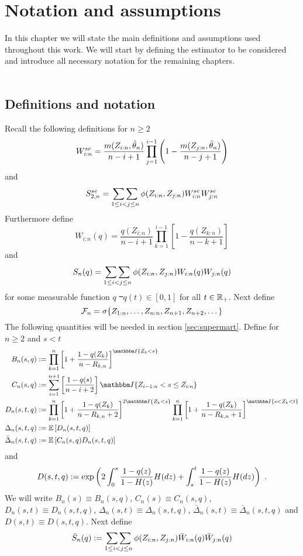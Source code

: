 \chapter{Notation and assumptions} \label{ch:notation}
In this chapter we will state the main definitions and assumptions used throughout this work. We will start by defining the estimator to be considered and introduce all necessary notation for the remaining chapters.\\
\\
\section{Definitions and notation}
Recall the following definitions for $n\geq2$
$$W_{i:n}^{se} = \frac{m(Z_{i:n}, \hat{\theta}_n)}{n-i+1} \prod\limits_{j=1}^{i-1}\left(1-\frac{m(Z_{j:n}, \hat{\theta}_n)}{n-j+1}\right)$$
%
and
$$S_{2,n}^{se} = \mathop{\sum\sum}\limits_{1\leq i<j\leq n}\phi(Z_{i:n}, Z_{j:n})W_{i:n}^{se}W_{j:n}^{se}$$
%
Furthermore define
$$W_{i:n}(q) = \frac{q(Z_{i:n})}{n-i+1}\prod_{k=1}^{i-1}\left[1-\frac{q(Z_{k:n})}{n-k+1}\right]$$
and 
$$S_{n}(q) = \mathop{\sum\sum}\limits_{1\leq i<j\leq n}\phi(Z_{i:n}, Z_{j:n})W_{i:n}(q)W_{j:n}(q)$$
for some measurable function $q$ \st\ $q(t)\in[0,1]$ for all $t\in\mathbb{R}_+$.
%
Next define
$$\mathcal{F}_n = \sigma\{Z_{1:n}, \dots, Z_{n:n}, Z_{n+1}, Z_{n+2}, \dots\}$$
%
The following quantities will be needed in section \ref{sec:supermart}. Define for $n\geq 2$ and $s < t$
\begin{align*}
B_n(s,q) &:= \prod_{k=1}^{n}\left[1+\frac{1-q(Z_{k})}{n-R_{k,n}}\right]^{\I{Z_{k} < s}}\\
C_n(s,q) &:= \sum_{i=1}^{n+1}\left[\frac{1-q(s)}{n-i+2}\right]\I{Z_{i-1:n} < s \leq Z_{i:n}}\\
D_n(s,t,q) &:= \prod_{k=1}^{n} \left[1+\frac{1-q(Z_k)}{n-R_{k,n} +2}\right]^{2\I{Z_k<s}} \prod_{k=1}^{n}\left[1+\frac{1-q(Z_k)}{n-R_ {k,n}+1}\right]^{\I{s < Z_k < t}}\\
\Delta_n(s,t,q) &:= \E\left[D_n(s,t,q) \right]\\
\bar{\Delta}_n(s,t,q) &:= \E\left[C_n(s,q)D_n(s,t,q) \right]
\end{align*}
and
$$D(s,t,q) := \exp\left(2\int_{0}^{s} \frac{1-q(z)}{1-H(z)} H(dz) + \int_{s}^{t} \frac{1-q(z)}{1-H(z)} H(dz)\right)\textrm{ .}$$
We will write $B_n(s) \equiv B_n(s,q)$, $C_n(s) \equiv C_n(s,q)$, $D_n(s,t) \equiv D_n(s,t,q)$, $\Delta_n(s,t) \equiv \Delta_n(s,t,q)$, $\bar\Delta_n(s,t) \equiv \bar\Delta_n(s,t,q)$ and $D(s,t) \equiv D(s,t,q)$. Next define
$$\bar{S}_n(q) := \mathop{\sum\sum}\limits_{1\leq i < j \leq n} \phi(Z_{i:n},Z_{j:n}) \bar{W}_{i:n}(q) \bar{W}_{j:n}(q)$$

